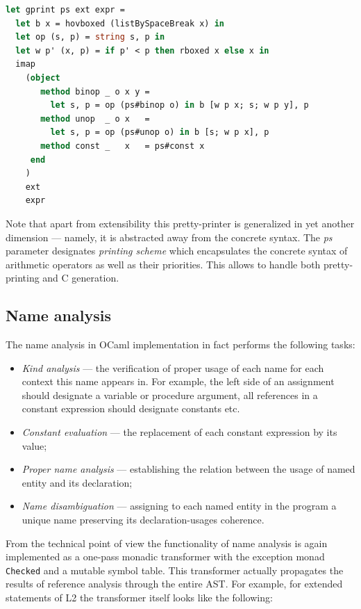 \begin{lstlisting}[language=ocaml]
let gprint ps ext expr =
  let b x = hovboxed (listBySpaceBreak x) in
  let op (s, p) = string s, p in
  let w p' (x, p) = if p' < p then rboxed x else x in 
  imap  
    (object 
       method binop _ o x y = 
         let s, p = op (ps#binop o) in b [w p x; s; w p y], p
       method unop  _ o x   = 
         let s, p = op (ps#unop o) in b [s; w p x], p
       method const _   x   = ps#const x
     end
    )
    ext
    expr
\end{lstlisting}

Note that apart from extensibility this pretty-printer is generalized in yet another 
dimension --- namely, it is abstracted away from the concrete syntax. The \emph{ps}
parameter designates \emph{printing scheme} which encapsulates the concrete
syntax of arithmetic operators as well as their priorities. This allows to handle
both pretty-printing and C generation.

\subsection{Name analysis}

The name analysis in OCaml implementation in fact performs the following tasks:

\begin{itemize}
\item \emph{Kind analysis} --- the verification of proper usage of each name for each context this
name appears in. For example, the left side of an assignment should designate a variable or procedure argument,
all references in a constant expression should designate constants etc.
\item \emph{Constant evaluation} --- the replacement of each constant expression by
its value;
\item \emph{Proper name analysis} --- establishing the relation between the usage of
named entity and its declaration;
\item \emph{Name disambiguation} --- assigning to each named entity in the program a unique
name preserving its declaration-usages coherence.
\end{itemize}

From the technical point of view the functionality of name analysis is again implemented as a 
one-pass monadic transformer with the exception monad \lstinline{Checked} and a mutable symbol 
table. This transformer actually propagates the results of reference analysis through the 
entire AST. For example, for extended statements of L2 the transformer itself looks like
the following:

